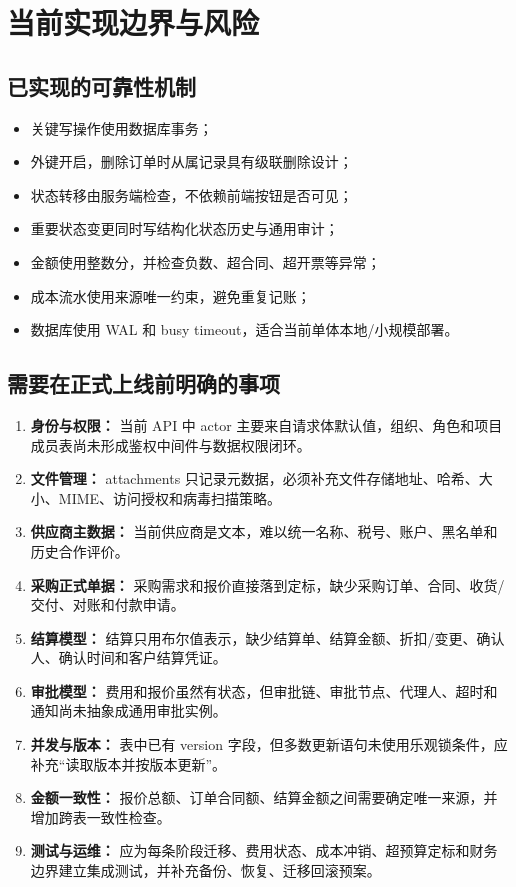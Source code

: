 \documentclass[UTF8,a4paper,11pt]{ctexart}
\begin{document}
\section{当前实现边界与风险}
\subsection{已实现的可靠性机制}
\begin{itemize}
  \item 关键写操作使用数据库事务；
  \item 外键开启，删除订单时从属记录具有级联删除设计；
  \item 状态转移由服务端检查，不依赖前端按钮是否可见；
  \item 重要状态变更同时写结构化状态历史与通用审计；
  \item 金额使用整数分，并检查负数、超合同、超开票等异常；
  \item 成本流水使用来源唯一约束，避免重复记账；
  \item 数据库使用 WAL 和 busy timeout，适合当前单体本地/小规模部署。
\end{itemize}

\subsection{需要在正式上线前明确的事项}
\begin{enumerate}
  \item \textbf{身份与权限：} 当前 API 中 actor 主要来自请求体默认值，组织、角色和项目成员表尚未形成鉴权中间件与数据权限闭环。
  \item \textbf{文件管理：} attachments 只记录元数据，必须补充文件存储地址、哈希、大小、MIME、访问授权和病毒扫描策略。
  \item \textbf{供应商主数据：} 当前供应商是文本，难以统一名称、税号、账户、黑名单和历史合作评价。
  \item \textbf{采购正式单据：} 采购需求和报价直接落到定标，缺少采购订单、合同、收货/交付、对账和付款申请。
  \item \textbf{结算模型：} 结算只用布尔值表示，缺少结算单、结算金额、折扣/变更、确认人、确认时间和客户结算凭证。
  \item \textbf{审批模型：} 费用和报价虽然有状态，但审批链、审批节点、代理人、超时和通知尚未抽象成通用审批实例。
  \item \textbf{并发与版本：} 表中已有 version 字段，但多数更新语句未使用乐观锁条件，应补充“读取版本并按版本更新”。
  \item \textbf{金额一致性：} 报价总额、订单合同额、结算金额之间需要确定唯一来源，并增加跨表一致性检查。
  \item \textbf{测试与运维：} 应为每条阶段迁移、费用状态、成本冲销、超预算定标和财务边界建立集成测试，并补充备份、恢复、迁移回滚预案。
\end{enumerate}
\end{document}
